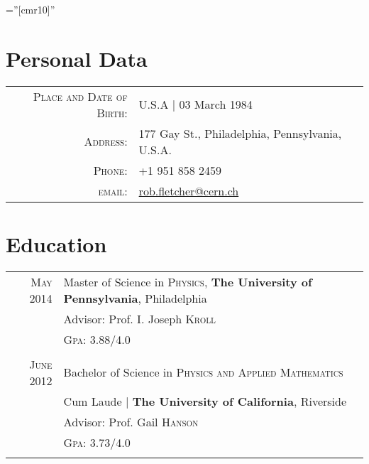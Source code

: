 \documentclass[a4paper,10pt]{article} %
\begin{document}
\pagestyle{empty} %

\font\fb=''[cmr10]'' %


\par{\bigskip\par} %

\section{Personal Data}

\begin{tabular}{rl}
\textsc{Place and Date of Birth:} & U.S.A  | 03 March 1984 \\
\textsc{Address:} & 177 Gay St., Philadelphia, Pennsylvania, U.S.A. \\
\textsc{Phone:} & +1 951 858 2459\\
\textsc{email:} & \href{mailto:rob.fletcher@cern.ch}{rob.fletcher@cern.ch}
\end{tabular}



\section{Education}

\begin{tabular}{rl}
\textsc{May} 2014 & Master of Science in \textsc{Physics}, \textbf{The University of Pennsylvania}, Philadelphia\\
&\small Advisor: Prof. I. Joseph \textsc{Kroll}\\
&\normalsize \textsc{Gpa}: 3.88/4.0\\
&\\


\textsc{June} 2012& Bachelor of Science in \textsc{}\textsc{Physics and Applied Mathematics} \\
&Cum Laude | \normalsize\textbf{The University of California}, Riverside\\
&\small Advisor: Prof. Gail \textsc{Hanson}\\
&\normalsize \textsc{Gpa}: 3.73/4.0 \\
&\\


\end{tabular}
\end{document}
